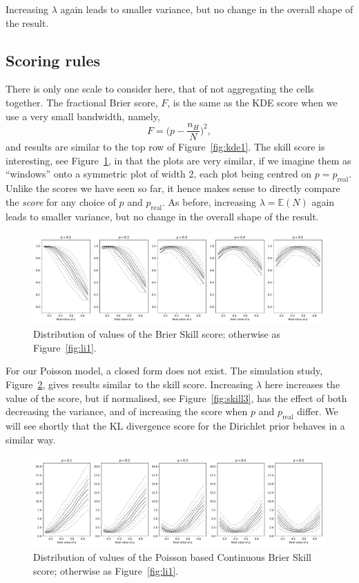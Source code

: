 \documentclass[twoside,a4paper,twocolumn,10pt]{article}
\theoremstyle{plain}
\theoremstyle{definition}
\begin{document}
Increasing $\lambda$ again leads to smaller variance, but no change in
the overall shape of the result.



\subsection{Scoring rules}

There is only one scale to consider here, that of not aggregating the cells together.
The fractional Brier score, $F$, is the same as the KDE score when we use a
very small bandwidth, namely,
\[ F = \Big(p - \frac{n_H}{N}\Big)^2, \]
and results are similar to the top row of
Figure~\ref{fig:kde1}.  The skill score is interesting, see Figure~\ref{fig:skill1},
in that the plots are very similar, if we imagine them as ``windows'' onto
a symmetric plot of width 2, each plot being centred on $p = p_{\text{real}}$.
Unlike the scores we have seen so far, it hence makes sense to directly
compare the \emph{score} for any choice of $p$ and $p_{\text{real}}$.
As before, increasing $\lambda = \mathbb E(N)$ again leads to smaller variance, but
no change in the overall shape of the result.

\begin{figure}
  \includegraphics[width=\textwidth]{../details/brier_skill_toy.pdf}
  \caption{Distribution of values of the Brier Skill score; otherwise as
  Figure~\ref{fig:li1}.}
  \label{fig:skill1}
\end{figure}

For our Poisson model, a closed form does not exist.  The simulation study,
Figure~\ref{fig:skill2}, gives results similar to the skill score.  Increasing $\lambda$
here increases the value of the score, but if normalised, see Figure~\ref{fig:skill3},
has the effect of both decreasing the variance, and of increasing the score when
$p$ and $p_{\text{real}}$ differ.  We will see shortly that the KL divergence
score for the Dirichlet prior behaves in a similar way.

\begin{figure}
  \includegraphics[width=\textwidth]{../details/brier_poisson_toy.pdf}
  \caption{Distribution of values of the Poisson based Continuous Brier Skill score;
  otherwise as Figure~\ref{fig:li1}.}
  \label{fig:skill2}
\end{figure}
\end{document}
